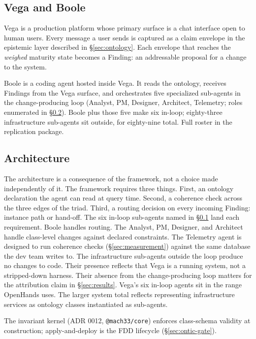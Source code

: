 \documentclass[conference,10pt]{IEEEtran}
\begin{document}
\subsection{Vega and Boole}\label{sec:vega-boole}

Vega is a production platform whose primary surface is a chat interface
open to human users. Every message a user sends is captured as a claim
envelope in the epistemic layer described in
§\ref{sec:ontology}. Each envelope that reaches the \emph{weighed}
maturity state becomes a Finding: an addressable proposal for a change
to the system.

Boole is a coding agent hosted inside Vega. It reads the ontology,
receives Findings from the Vega surface, and orchestrates five
specialized sub-agents in the change-producing loop (Analyst, PM,
Designer, Architect, Telemetry; roles enumerated in
§\ref{sec:architecture}). Boole plus those five make six
in-loop; eighty-three infrastructure sub-agents sit outside, for
eighty-nine total. Full roster in the replication package.

\subsection{Architecture}\label{sec:architecture}

The architecture is a consequence of the framework, not a choice made
independently of it. The framework requires three things. First, an
ontology declaration the agent can read at query time. Second, a
coherence check across the three edges of the triad. Third, a routing
decision on every incoming Finding: instance path or hand-off. The six
in-loop sub-agents named in §\ref{sec:vega-boole} land each
requirement. Boole handles routing. The Analyst, PM, Designer, and
Architect handle class-level changes against declared constraints. The
Telemetry agent is designed to run coherence checks (§\ref{sec:measurement})
against the same database the dev team writes to. The infrastructure
sub-agents outside the loop produce no changes to code. Their presence
reflects that Vega is a running system, not a stripped-down harness.
Their absence from the change-producing loop matters for the attribution
claim in §\ref{sec:results}. Vega's six in-loop
agents sit in the range OpenHands \cite{openhands2025} uses. The larger
system total reflects representing infrastructure services as ontology
classes instantiated as sub-agents.

The invariant kernel (ADR 0012, \texttt{@mach33/core}) enforces class-schema
validity at construction; apply-and-deploy is the FDD lifecycle
(§\ref{sec:ontic-gate}).
\end{document}
